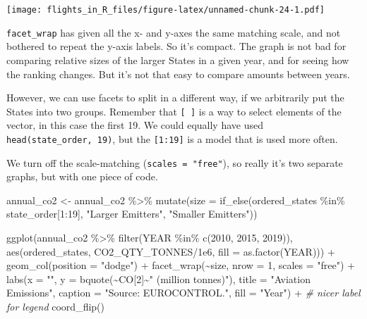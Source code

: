 \documentclass[
]{book}
\newenvironment{Shaded}{\begin{snugshade}}{\end{snugshade}}
\newcommand{\AttributeTok}[1]{\textcolor[rgb]{0.77,0.63,0.00}{#1}}
\newcommand{\CommentTok}[1]{\textcolor[rgb]{0.56,0.35,0.01}{\textit{#1}}}
\newcommand{\DecValTok}[1]{\textcolor[rgb]{0.00,0.00,0.81}{#1}}
\newcommand{\FloatTok}[1]{\textcolor[rgb]{0.00,0.00,0.81}{#1}}
\newcommand{\FunctionTok}[1]{\textcolor[rgb]{0.00,0.00,0.00}{#1}}
\newcommand{\NormalTok}[1]{#1}
\newcommand{\OtherTok}[1]{\textcolor[rgb]{0.56,0.35,0.01}{#1}}
\newcommand{\SpecialCharTok}[1]{\textcolor[rgb]{0.00,0.00,0.00}{#1}}
\newcommand{\StringTok}[1]{\textcolor[rgb]{0.31,0.60,0.02}{#1}}
\begin{document}
\texttt{[image: flights\_in\_R\_files/figure-latex/unnamed-chunk-24-1.pdf]}

\texttt{facet\_wrap} has given all the x- and y-axes the same matching scale, and not bothered to repeat the y-axis labels. So it's compact. The graph is not bad for comparing relative sizes of the larger States in a given year, and for seeing how the ranking changes. But it's not that easy to compare amounts between years.

However, we can use facets to split in a different way, if we arbitrarily put the States into two groups. Remember that \texttt{{[}\ {]}} is a way to select elements of the vector, in this case the first 19. We could equally have used \texttt{head(state\_order,\ 19)}, but the \texttt{{[}1:19{]}} is a model that is used more often.

We turn off the scale-matching (\texttt{scales\ =\ "free"}), so really it's two separate graphs, but with one piece of code.

\begin{Shaded}
\begin{Highlighting}[]
\NormalTok{annual\_co2 }\OtherTok{\textless{}{-}}\NormalTok{ annual\_co2 }\SpecialCharTok{\%\textgreater{}\%} 
  \FunctionTok{mutate}\NormalTok{(}\AttributeTok{size =} \FunctionTok{if\_else}\NormalTok{(ordered\_states }\SpecialCharTok{\%in\%}\NormalTok{ state\_order[}\DecValTok{1}\SpecialCharTok{:}\DecValTok{19}\NormalTok{], }
                        \StringTok{"Larger Emitters"}\NormalTok{, }\StringTok{"Smaller Emitters"}\NormalTok{))}

\FunctionTok{ggplot}\NormalTok{(annual\_co2 }\SpecialCharTok{\%\textgreater{}\%} 
         \FunctionTok{filter}\NormalTok{(YEAR }\SpecialCharTok{\%in\%} \FunctionTok{c}\NormalTok{(}\DecValTok{2010}\NormalTok{, }\DecValTok{2015}\NormalTok{, }\DecValTok{2019}\NormalTok{)), }
       \FunctionTok{aes}\NormalTok{(ordered\_states,}
\NormalTok{           CO2\_QTY\_TONNES}\SpecialCharTok{/}\FloatTok{1e6}\NormalTok{,}
           \AttributeTok{fill =} \FunctionTok{as.factor}\NormalTok{(YEAR))) }\SpecialCharTok{+}  
  \FunctionTok{geom\_col}\NormalTok{(}\AttributeTok{position =} \StringTok{"dodge"}\NormalTok{) }\SpecialCharTok{+}
  \FunctionTok{facet\_wrap}\NormalTok{(}\SpecialCharTok{\textasciitilde{}}\NormalTok{size, }\AttributeTok{nrow =} \DecValTok{1}\NormalTok{, }\AttributeTok{scales =} \StringTok{"free"}\NormalTok{) }\SpecialCharTok{+} 
  \FunctionTok{labs}\NormalTok{(}\AttributeTok{x =} \StringTok{""}\NormalTok{, }
       \AttributeTok{y =} \FunctionTok{bquote}\NormalTok{(}\SpecialCharTok{\textasciitilde{}}\NormalTok{CO[}\DecValTok{2}\NormalTok{]}\SpecialCharTok{\textasciitilde{}}\StringTok{" (million tonnes)"}\NormalTok{),}
       \AttributeTok{title =} \StringTok{"Aviation Emissions"}\NormalTok{,}
       \AttributeTok{caption =} \StringTok{"Source: EUROCONTROL."}\NormalTok{,}
       \AttributeTok{fill =} \StringTok{"Year"}\NormalTok{) }\SpecialCharTok{+} \CommentTok{\# nicer label for legend}
  \FunctionTok{coord\_flip}\NormalTok{()}
\end{Highlighting}
\end{Shaded}
\end{document}
